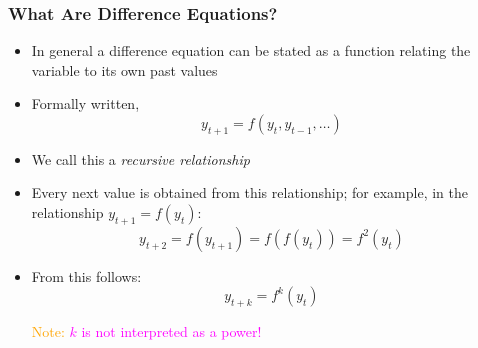 \documentclass[10pt,usenames,dvipsnames]{beamer}
\theoremstyle{plain}
\theoremstyle{definition}
\begin{document}
%

\begin{frame}[fragile]
	\frametitle{What Are Difference Equations?}
	\begin{itemize}
		\item In general a difference equation can be stated as a function relating the variable to its own past values
		\item Formally written,
		\[
		y_{t+1} = f(y_{t},y_{t-1},\ldots)
		\]
		\item We call this a \emph{recursive relationship}
		\item Every next value is obtained from this relationship; for example, in the relationship $y_{t+1} = f(y_{t})$:
		\[
		y_{t+2} = f(y_{t+1}) = f(f(y_{t})) = f^{2}(y_{t})
		\]
		\item From this follows:
		\[
		y_{t+k} = f^{k}(y_{t})
		\]
		
		\textcolor{orange}{Note: }\textcolor{magenta}{$k$ is not interpreted as a power!}
		
	\end{itemize}
\end{frame}
\end{document}
